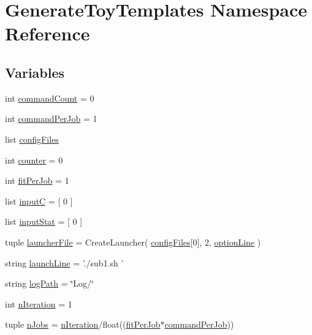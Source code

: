 \hypertarget{namespaceGenerateToyTemplates}{\section{Generate\+Toy\+Templates Namespace Reference}
\label{namespaceGenerateToyTemplates}
}
\subsection*{Variables}
\begin{DoxyCompactItemize}
\item 
int \hyperlink{namespaceGenerateToyTemplates_acb8db36e3de4a84015c95176dd95ce8e}{command\+Count} = 0
\item 
int \hyperlink{namespaceGenerateToyTemplates_a96fb11e5974434de1862d54d5dbacb3d}{command\+Per\+Job} = 1
\item 
list \hyperlink{namespaceGenerateToyTemplates_a548114e88a3acfb5bec64fb8ce538b06}{config\+Files}
\item 
int \hyperlink{namespaceGenerateToyTemplates_a617a47c70795bcff659815ad0efd2266}{counter} = 0
\item 
int \hyperlink{namespaceGenerateToyTemplates_a4f12240caa1a7a0e6db36cd4409800c3}{fit\+Per\+Job} = 1
\item 
list \hyperlink{namespaceGenerateToyTemplates_a4e6f79944208b4ca7650cf6c7a06aaa0}{input\+C} = \mbox{[} 0 \mbox{]}
\item 
list \hyperlink{namespaceGenerateToyTemplates_a936c20454446cea1ccf4674fc1250799}{input\+Stat} = \mbox{[} 0 \mbox{]}
\item 
tuple \hyperlink{namespaceGenerateToyTemplates_a5b48729fda45e30d48c8484a3ad43fd4}{launcher\+File} = Create\+Launcher( \hyperlink{namespaceGenerateToyTemplates_a548114e88a3acfb5bec64fb8ce538b06}{config\+Files}\mbox{[}0\mbox{]}, 2, \hyperlink{namespaceGenerateToyTemplates_a51b79a8a6aae1e130ae3e361104ea0d6}{option\+Line} )
\item 
string \hyperlink{namespaceGenerateToyTemplates_a8eea97e1ca8a5a189a61413147b373bf}{launch\+Line} = './sub1.\+sh '
\item 
string \hyperlink{namespaceGenerateToyTemplates_a7f4934f0abd9c9e9d1da7b4b49fdfecc}{log\+Path} = \char`\"{}Log/\char`\"{}
\item 
int \hyperlink{namespaceGenerateToyTemplates_a6c89d21ce03405f979a97bbfe96a1169}{n\+Iteration} = 1
\item 
tuple \hyperlink{namespaceGenerateToyTemplates_abab193068c223e1d91bfd2839e6ad48a}{n\+Jobs} = \hyperlink{namespaceGenerateToyTemplates_a6c89d21ce03405f979a97bbfe96a1169}{n\+Iteration}/float((\hyperlink{namespaceGenerateToyTemplates_a4f12240caa1a7a0e6db36cd4409800c3}{fit\+Per\+Job}$\ast$\hyperlink{namespaceGenerateToyTemplates_a96fb11e5974434de1862d54d5dbacb3d}{command\+Per\+Job}))

\end{DoxyCompactItemize}

